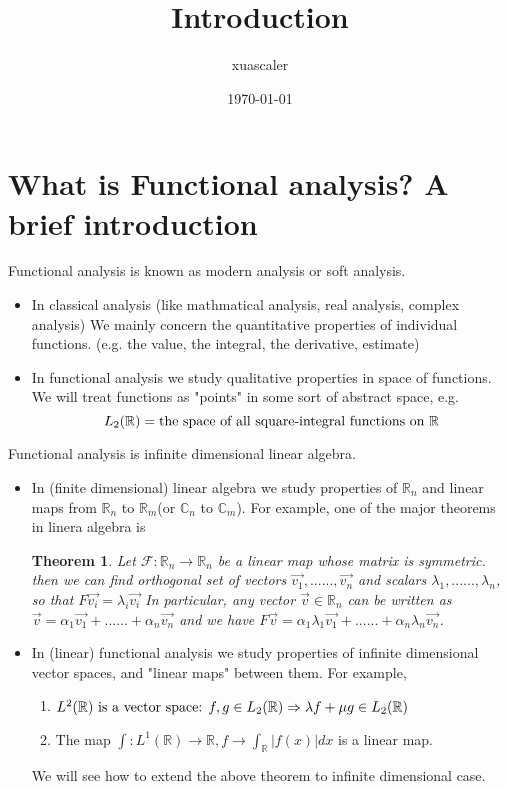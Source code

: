 \documentclass{article}
\title{Introduction}
\author{xuascaler}
\date{\today}
\newtheorem*{theorem}{Theorem}
\begin{document}
\maketitle

\section*{What is Functional analysis? A brief introduction}
Functional analysis is known as modern analysis or soft analysis.
\begin{itemize}
    \item In classical analysis (like mathmatical analysis, real analysis, complex analysis)
    We mainly concern the quantitative properties of individual functions.
    (e.g. the value, the integral, the derivative, estimate)
    \item In functional analysis we study qualitative properties in space of functions.
    We will treat functions as "points" in some sort of abstract space, e.g.
    \[
        L_2(\mathbb{R}) = \textnormal{the space of all square-integral functions on } \mathbb{R}
    \]
\end{itemize}
Functional analysis is infinite dimensional linear algebra.
\begin{itemize}
    \item In (finite dimensional) linear algebra we study properties of $\mathbb{R}_n$ and 
    linear maps from $\mathbb{R}_n$ to $\mathbb{R}_m$(or $\mathbb{C}_n$ to $\mathbb{C}_m$).
    For example, one of the major theorems in linera algebra is
    \begin{theorem}
        Let $\mathcal{F}:\mathbb{R}_n \rightarrow \mathbb{R}_n$ be a linear map whose matrix is symmetric.
        then we can find orthogonal set of vectors $\overrightarrow{v_{1}}, ......, \overrightarrow{v_{n}}$
        and scalars $\lambda_1,......,\lambda_n$, so that $F\overrightarrow{v_i}=\lambda_{i}\overrightarrow{v_{i}}$
        In particular, any vector $\overrightarrow{v} \in \mathbb{R}_{n}$ can be written as
        $\overrightarrow{v} = \alpha_1\overrightarrow{v_1} + ...... + \alpha_n\overrightarrow{v_n}$
        and we have 
        $F\overrightarrow{v} = \alpha_1\lambda_1\overrightarrow{v_1} +......+\alpha_n\lambda_n\overrightarrow{v_n}$.
    \end{theorem}
    \item In (linear) functional analysis we study properties of infinite dimensional vector spaces,
    and "linear maps" between them. For example,
    \begin{enumerate}
        \item $L^2(\mathbb{R}) \textnormal{ is a vector space: } f, g \in L_2(\mathbb{R}) \Rightarrow \lambda f + \mu g \in L_2(\mathbb{R})$
        \item The map $\int : L^1(\mathbb{R}) \rightarrow \mathbb{R}, f \rightarrow \int_{\mathbb{R}}{|f(x)|}dx$ is a linear map.
    \end{enumerate}
    We will see how to extend the above theorem to infinite dimensional case.
\end{itemize}
\end{document}
